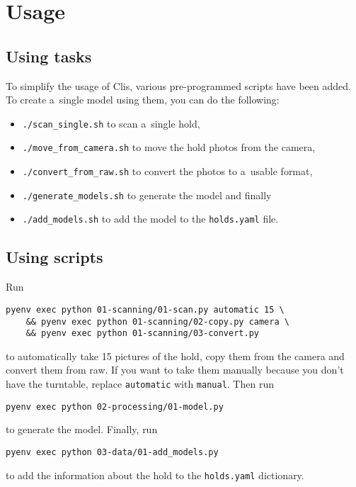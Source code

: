 \section{Usage}

\subsection{Using tasks}

To simplify the usage of Clis, various pre-programmed scripts have been added.
To create a~single model using them, you can do the following:

\begin{itemize}
	\item \texttt{./scan_single.sh} to scan a~single hold,
	\item \texttt{./move_from_camera.sh} to move the hold photos from the camera,
	\item \texttt{./convert_from_raw.sh} to convert the photos to a~usable format,
	\item \texttt{./generate_models.sh} to generate the model and finally
	\item \texttt{./add_models.sh} to add the model to the \texttt{holds.yaml} file.
\end{itemize}

\subsection{Using scripts}

Run

\begin{verbatim}
pyenv exec python 01-scanning/01-scan.py automatic 15 \
	&& pyenv exec python 01-scanning/02-copy.py camera \
	&& pyenv exec python 01-scanning/03-convert.py
\end{verbatim}
to automatically take 15 pictures of the hold, copy them from the camera
and convert them from raw. If you want to take them manually because you
don't have the turntable, replace \texttt{automatic} with
\texttt{manual}. Then run
\begin{verbatim}
pyenv exec python 02-processing/01-model.py
\end{verbatim}
to generate the model. Finally, run
\begin{verbatim}
pyenv exec python 03-data/01-add_models.py
\end{verbatim}
to add the information about the hold to the \texttt{holds.yaml}
dictionary.
